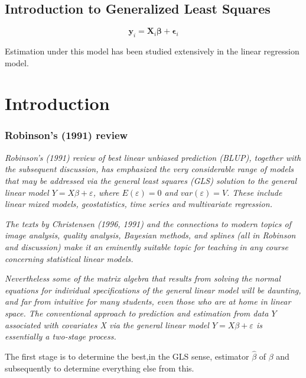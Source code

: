 \documentclass[12pt, a4paper]{article}
\begin{document}
\subsection{Introduction to Generalized Least Squares}
\begin{equation}
\boldsymbol{y}_i = \boldsymbol{X}_i\boldsymbol{\beta} + \boldsymbol{\epsilon}_i
\end{equation}



Estimation under this model has been studied extensively in the linear regression model.



\section{Introduction}
\subsubsection{Robinson's (1991) review}
\emph{ Robinson's (1991) review of best linear unbiased prediction (BLUP), together with the subsequent discussion, has emphasized the very considerable range of models that may be addressed via the general least squares (GLS) solution to the general linear model $Y = X\beta + \varepsilon$, where $E(\varepsilon) = 0$ and $var(\varepsilon) = V$. These include linear mixed models, geostatistics, time series and multivariate regression.}


\emph{ The texts by Christensen (1996, 1991) and the connections to modern topics of image analysis, quality analysis, Bayesian methods, and splines (all in Robinson and discussion) make it an eminently suitable topic for teaching in any course concerning statistical linear models. }


\emph{Nevertheless some of the matrix algebra that results from solving the normal equations for individual specifications of the general linear model will be daunting, and far from intuitive for many students, even those who are at home in linear space. The conventional approach to prediction and estimation from data $Y$ associated with covariates X via the general linear model $Y = X\beta + \varepsilon$ is essentially a two-stage process.}

The first stage is to determine the best,in the GLS sense, estimator $\hat{\beta}$ of $\beta$ and subsequently to determine everything else from this.
\end{document}
